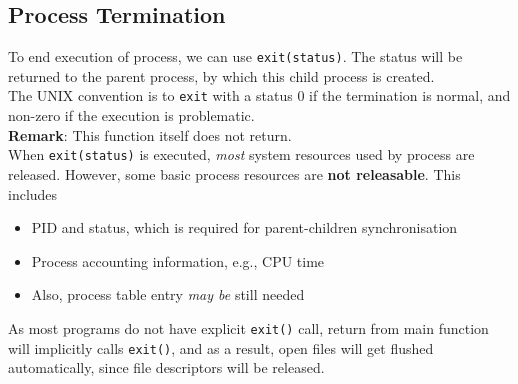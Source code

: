 \documentclass[12pt]{article}
\theoremstyle{definition}
\begin{document}
\subsection{Process Termination}
To end execution of process, we can use \texttt{exit(status)}. The status will be returned to the parent process, by which this child process is created.\\
The UNIX convention is to \texttt{exit} with a status $0$ if the termination is normal, and non-zero if the execution is problematic.\\
\textbf{Remark}: This function itself does not return.\\
When \texttt{exit(status)} is executed, \textit{most} system resources used by process are released. However, some basic process resources are \textbf{not releasable}. This includes
\begin{itemize}
\item PID and status, which is required for parent-children synchronisation
\item Process accounting information, e.g., CPU time\
\item Also, process table entry \textit{may be} still needed
\end{itemize}   
As most programs do not have explicit \texttt{exit()} call, return from main function will implicitly calls \texttt{exit()}, and as a result, open files will get flushed automatically, since file descriptors will be released.
\end{document}
